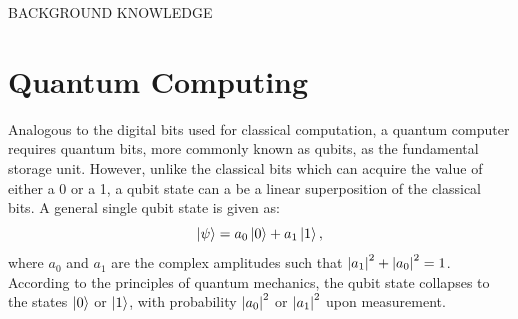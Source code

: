 \documentclass[12]{article}
\begin{document}
\begin{center}
\begin{Huge}
BACKGROUND KNOWLEDGE
\end{Huge}
\end{center}
\section{Quantum Computing}
Analogous to the digital bits used for classical computation, a quantum computer requires quantum bits, more commonly known as qubits, as the fundamental storage unit. However, unlike the classical bits which can acquire the value of either a 0 or a 1, a qubit state can a be a linear superposition of the classical bits. A general single qubit state is given as:
\begin{equation}
\ket{\psi}= a_0 \ket{0} + a_1 \ket{1},  \label{eq:b1}
\end{equation}
where $a_0$ and $a_1$ are the complex amplitudes such that ${\abs{a_1}}^2 +{\abs{a_0}}^2 =1$. According to the principles of quantum mechanics, the qubit state collapses to the states $\ket{0}$ or $\ket{1}$, with probability ${\abs{a_0}}^2$ or ${\abs{a_1}}^2$ upon  measurement. 
\end{document}
